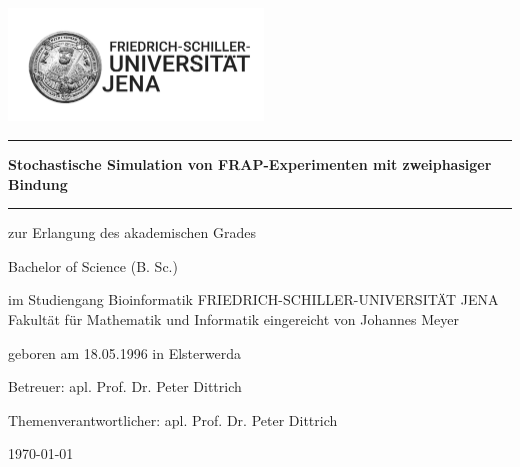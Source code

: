 \begin{titlepage}
	\thispagestyle{empty}
	\newcommand{\Rule}{\rule{\textwidth}{1mm}}
	\begin{center}
		\includegraphics[height=30mm]{./Bilder/HanfriedLogo}
		\Rule \vspace{5mm}
		\onehalfspacing \LARGE \textbf{Stochastische Simulation von FRAP-Experimenten mit zweiphasiger Bindung}
		\vspace{1mm} \Rule
		\vfill
		\textbf{}\par
		zur Erlangung des akademischen Grades\par
		Bachelor of Science (B. Sc.)\par
		im Studiengang Bioinformatik
		\vfill
		\LARGE \doublespacing FRIEDRICH-SCHILLER-UNIVERSITÄT JENA\newline
		\large Fakultät für Mathematik und Informatik
		\vfill \singlespacing
		eingereicht von Johannes Meyer\par
		geboren am 18.05.1996 in Elsterwerda\par
		\vfill
		Betreuer: apl. Prof. Dr. Peter Dittrich\par
		Themenverantwortlicher: apl. Prof. Dr. Peter Dittrich\par
		\vfill
		\today  %
	\end{center}
\end{titlepage}